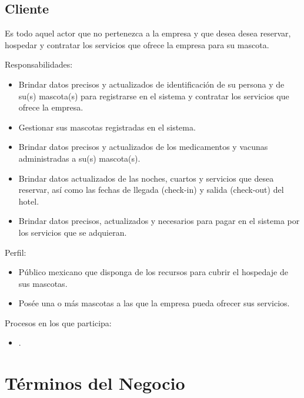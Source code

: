 	\begin{Usuario}{\hypertarget{Cliente}{\subsection{Cliente}}}{
			Es todo aquel actor que no pertenezca a la empresa y que desea desea reservar, hospedar y contratar los servicios que ofrece la empresa para su mascota.
		}
		\item[Responsabilidades:] \cdtEmpty
		\begin{itemize}
			\item Brindar datos precisos y actualizados de identificación de su persona y de su(s) mascota(s) para registrarse en el sistema y contratar los servicios que ofrece la empresa.
			\item Gestionar sus mascotas registradas en el sistema.
			\item Brindar datos precisos y actualizados de los medicamentos y vacunas administradas a su(s) mascota(s).
			\item Brindar datos actualizados de las noches, cuartos y servicios que desea reservar, así como las fechas de llegada (check-in) y salida (check-out) del hotel.
			\item Brindar datos precisos, actualizados y necesarios para pagar en el sistema por los servicios que se adquieran.
		\end{itemize}
		
		\item[Perfil:] \cdtEmpty
		\begin{itemize}
			\item Público mexicano que disponga de los recursos para cubrir el hospedaje de sus mascotas.
			\item Posée una o más mascotas a las que la empresa pueda ofrecer sus servicios.
		\end{itemize}
		\item[Procesos en los que participa:] \cdtEmpty
		\begin{itemize}
			\item .
		\end{itemize}
	\end{Usuario}

	
\section{Términos del Negocio}
\label{sec:terminosDeNegocio}


